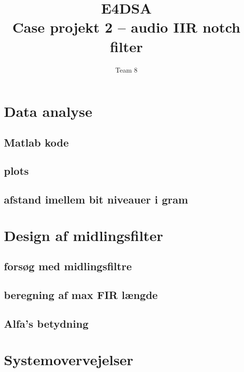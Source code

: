 \documentclass{article}
\title{E4DSA\\ Case projekt 2 – audio IIR notch filter}
\author{Team 8}
\begin{document}
\maketitle
\tableofcontents
\newpage

\section{Data analyse}
\label{sec:Data analyse}

\subsection{Matlab kode}
\label{sec:matlab1}

\subsection{plots}
\label{sec:plots}

\subsection{afstand imellem bit niveauer i gram}
\label{sec:afstand}

\section{Design af midlingsfilter}
\label{sec:Design}

\subsection{forsøg med midlingsfiltre}
\label{sec:forsøg}

\subsection{beregning af max FIR længde}
\label{sec:beregning}

\subsection{Alfa's betydning}
\label{sec:alfa}

\section{Systemovervejelser}
\label{sec:Systemovervejelser}
\end{document}
